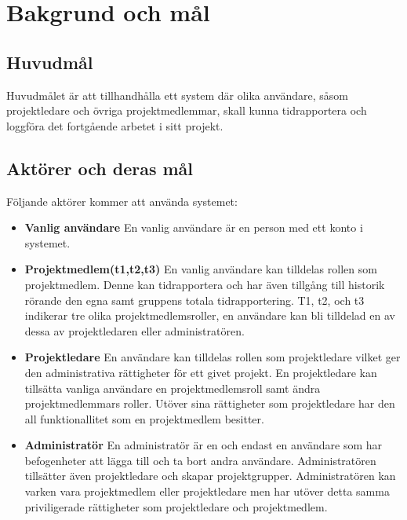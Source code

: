 \documentclass[a4paper]{article}
\begin{document}
\section{Bakgrund och mål}   
\subsection{Huvudmål}
Huvudmålet är att tillhandhålla ett system där olika användare, såsom projektledare och övriga projektmedlemmar, skall kunna tidrapportera och loggföra det fortgående arbetet i sitt projekt. 

\subsection{Aktörer och deras mål}
\label{bom-aktorer}
Följande aktörer kommer att använda systemet:
\begin{itemize}
\item [] \textbf{Vanlig användare} En vanlig användare är en person med ett konto i systemet.
\item [] \textbf{Projektmedlem(t1,t2,t3)} En vanlig användare kan tilldelas rollen som projektmedlem. Denne kan tidrapportera och har även tillgång till historik rörande den egna samt gruppens totala tidrapportering. T1, t2, och t3 indikerar tre olika projektmedlemsroller, en användare kan bli tilldelad en av dessa av projektledaren eller administratören.
\item [] \textbf{Projektledare} En användare kan tilldelas rollen som projektledare vilket ger den administrativa rättigheter för ett givet projekt. En projektledare kan tillsätta vanliga användare en projektmedlemsroll samt ändra projektmedlemmars roller. Utöver sina rättigheter som projektledare har den all funktionallitet som en projektmedlem besitter.
\item [] \textbf{Administratör} En administratör är en och endast en användare som har befogenheter att lägga till och ta bort andra användare. Administratören tillsätter även projektledare och skapar projektgrupper. Administratören kan varken vara projektmedlem eller projektledare men har utöver detta samma priviligerade rättigheter som projektledare och projektmedlem.
\end{itemize}
\newpage
\end{document}
